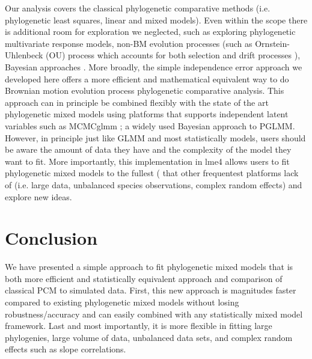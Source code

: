 Our analysis covers the classical phylogenetic comparative methods (i.e. phylogenetic least squares, linear and mixed models).
Even within the scope there is additional room for exploration we neglected, such as exploring phylogenetic multivariate response models, non-BM evolution processes (such as Ornstein-Uhlenbeck (OU) process which accounts for both selection and drift processes \cite{butler2004phylogenetic}), Bayesian approaches \cite{hadfield2010general}.
More broadly, the simple independence error approach we developed here offers a more efficient and mathematical equivalent way to do Brownian motion evolution process phylogenetic comparative analysis. 
This approach can in principle be combined flexibly with the state of the art phylogenetic mixed models using platforms that supports independent latent variables such as MCMCglmm \cite{hadfield2010mcmc}; a widely used Bayesian approach to PGLMM.
However, in principle just like GLMM and most statistically models, users should be aware the amount of data they have and the complexity of the model they want to fit.
More importantly, this implementation in lme4 allows users to fit phylogenetic mixed models to the fullest ( that other frequentest platforms lack of (i.e. large data, unbalanced species observations, complex random effects) and explore new ideas.


\section{Conclusion}

We have presented a simple approach to fit phylogenetic mixed models that is both more efficient and statistically equivalent approach and comparison of classical PCM to simulated data. 
First, this new approach is magnitudes faster compared to existing phylogenetic mixed models without losing robustness/accuracy and can easily combined with any statistically mixed model framework. 
Last and most importantly, it is more flexible in fitting large phylogenies, large volume of data, unbalanced data sets, and complex random effects such as slope correlations.



